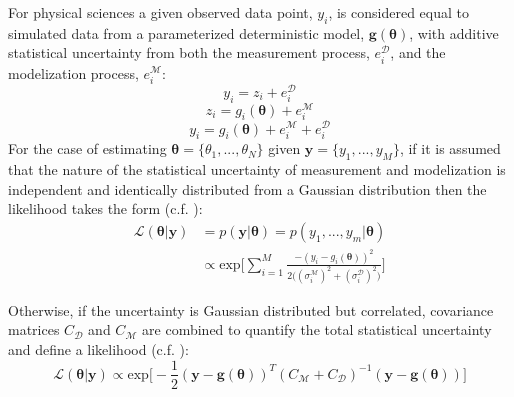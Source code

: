 For physical sciences a given observed data point, $y_i$, is considered equal to simulated data from a parameterized deterministic model, $\bm{g}(\bm{\theta})$, with additive statistical uncertainty from both the measurement process, $e^{\mathcal{D}}_i$, and the modelization process, $e^{\mathcal{M}}_i$:
\begin{equation}
y_i = z_i + e^{\mathcal{D}}_i
\end{equation}
\begin{equation}
z_i = g_i(\bm{\theta}) + e^{\mathcal{M}}_i
\end{equation}
\begin{equation}
y_i = g_i(\bm{\theta}) + e^{\mathcal{M}}_i + e^{\mathcal{D}}_i
\end{equation}
For the case of estimating $\bm{\theta} = \{\theta_1,...,\theta_N\}$ given $\bm{y} = \{y_1,...,y_M\}$, if it is assumed that the nature of the statistical uncertainty of measurement and modelization is independent and identically distributed from a Gaussian distribution then the likelihood takes the form (c.f. \citet[p.91-92]{gregory2005bayesian}): 
\begin{equation}
\begin{split}
\mathcal{L}(\bm{\theta}|\bm{y}) &= p(\bm{y}|\bm{\theta}) = p(y_1,...,y_m|\bm{\theta})\\
&\propto  \text{exp}\bigg[\sum_{i = 1}^{M}\frac{-(y_i-g_i({\bm{\theta}}))^2}{2\big((\sigma^{\mathcal{M}}_i)^2+(\sigma^{\mathcal{D}}_i)^2\big)}\bigg]
\end{split}
\label{likelihood-1}
\end{equation}

Otherwise, if the uncertainty is Gaussian distributed but correlated, covariance matrices $C_{\mathcal{D}}$ and $C_{\mathcal{M}}$ are combined to quantify the total statistical uncertainty and define a likelihood (c.f. \citet[p.35-36]{Tarantola2005}):
\begin{equation}
\mathcal{L}(\bm{\theta}|\bm{y}) \propto \text{exp}\bigg[-\frac{1}{2}(\bm{y}-\bm{g}(\bm{\theta}))^T(C_{\mathcal{M}}+C_{\mathcal{D}})^{-1}(\bm{y}-\bm{g}(\bm{\theta}))\bigg]
\label{likelihood-2}
\end{equation}
\newpage


